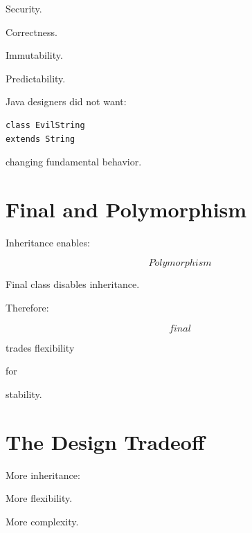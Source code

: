 \documentclass[11pt,a4paper]{book}
\begin{document}

Security.

Correctness.

Immutability.

Predictability.


Java designers did not want:

\begin{verbatim}
class EvilString
extends String
\end{verbatim}


changing fundamental behavior.


\section{Final and Polymorphism}

Inheritance enables:

\[
Polymorphism
\]


Final class disables inheritance.


Therefore:

\[
final
\]

trades flexibility

for

stability.


\section{The Design Tradeoff}

More inheritance:


More flexibility.


More complexity.

\end{document}
